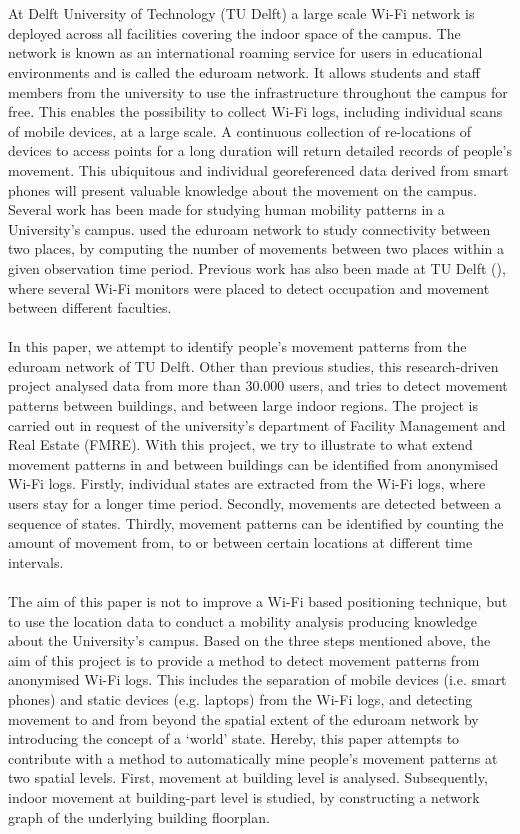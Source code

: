 \\\\
At Delft University of Technology (TU Delft) a large scale Wi-Fi network is deployed across all facilities covering the indoor space of the campus. The network is known as an international roaming service for users in educational environments and is called the eduroam network. It allows students and staff members from the university to use the infrastructure throughout the campus for free. This enables the possibility to collect Wi-Fi logs, including individual scans of mobile devices, at a large scale.  A continuous collection of re-locations of devices to access points for a long duration will return detailed records of people’s movement. This ubiquitous and individual georeferenced data derived from smart phones will present valuable knowledge about the movement on the campus. 
Several work has been made for studying human mobility patterns in a University’s campus. \cite{meneses2012large} used the eduroam network to study connectivity between two places, by computing the number of movements between two places within a given observation time period. Previous work has also been made at TU Delft (\cite{rhythmofthecampus}), where several Wi-Fi monitors were placed to detect occupation and movement between different faculties. 
\\\\
In this paper, we attempt to identify people’s movement patterns from the eduroam network of TU Delft. Other than previous studies, this research-driven project analysed data from more than 30.000 users, and tries to detect movement patterns between buildings, and between large indoor regions. The project is carried out in request of the university’s department of Facility Management and Real Estate (FMRE). With this project, we try to illustrate to what extend movement patterns in and between buildings can be identified from anonymised Wi-Fi logs. Firstly, individual states are extracted from the Wi-Fi logs, where users stay for a longer time period. Secondly, movements are detected between a sequence of states. Thirdly, movement patterns can be identified by counting the amount of movement from, to or between certain locations at different time intervals. 
\\\\
The aim of this paper is not to improve a Wi-Fi based positioning technique, but to use the location data to conduct a mobility analysis producing knowledge about the University’s campus. Based on the three steps mentioned above, the aim of this project is to provide a method to detect movement patterns from anonymised Wi-Fi logs. This includes the separation of mobile devices (i.e. smart phones) and static devices (e.g. laptops) from the Wi-Fi logs, and detecting movement to and from beyond the spatial extent of the eduroam network by introducing the concept of a ‘world’ state. Hereby, this paper attempts to contribute with a method to automatically mine people’s movement patterns at two spatial levels. First, movement at building level is analysed. Subsequently, indoor movement at building-part level is studied, by constructing a network graph of the underlying building floorplan. 
